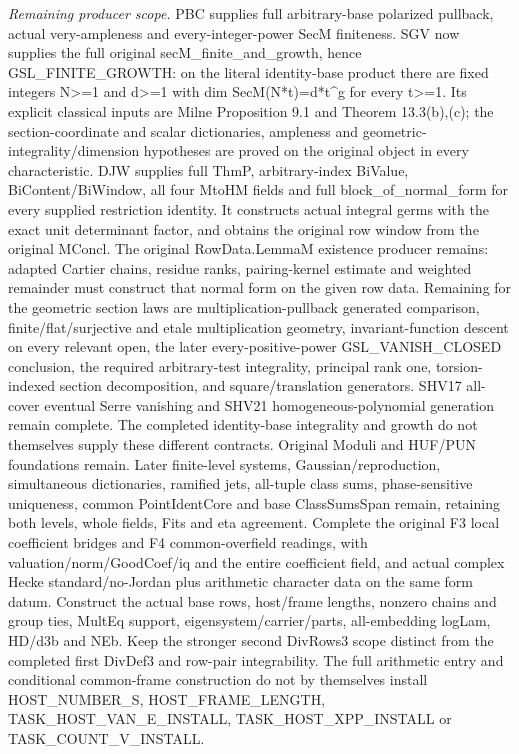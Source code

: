 \emph{Remaining producer scope.} PBC supplies full arbitrary-base polarized pullback, actual very-ampleness and every-integer-power SecM finiteness. SGV now supplies the full original secM\_\allowbreak finite\_\allowbreak and\_\allowbreak growth, hence GSL\_\allowbreak FINITE\_\allowbreak GROWTH: on the literal identity-base product there are fixed integers N>=1 and d>=1 with dim SecM(N*t)=d*t\textasciicircum{}g for every t>=1. Its explicit classical inputs are Milne Proposition 9.1 and Theorem 13.3(b),(c); the section-coordinate and scalar dictionaries, ampleness and geometric-integrality/dimension hypotheses are proved on the original object in every characteristic. DJW supplies full ThmP, arbitrary-index BiValue, BiContent/BiWindow, all four MtoHM fields and full block\_\allowbreak of\_\allowbreak normal\_\allowbreak form for every supplied restriction identity. It constructs actual integral germs with the exact unit determinant factor, and obtains the original row window from the original MConcl. The original RowData.LemmaM existence producer remains: adapted Cartier chains, residue ranks, pairing-kernel estimate and weighted remainder must construct that normal form on the given row data. Remaining for the geometric section laws are multiplication-pullback generated comparison, finite/flat/surjective and etale multiplication geometry, invariant-function descent on every relevant open, the later every-positive-power GSL\_\allowbreak VANISH\_\allowbreak CLOSED conclusion, the required arbitrary-test integrality, principal rank one, torsion-indexed section decomposition, and square/translation generators. SHV17 all-cover eventual Serre vanishing and SHV21 homogeneous-polynomial generation remain complete. The completed identity-base integrality and growth do not themselves supply these different contracts. Original Moduli and HUF/PUN foundations remain. Later finite-level systems, Gaussian/reproduction, simultaneous dictionaries, ramified jets, all-tuple class sums, phase-sensitive uniqueness, common PointIdentCore and base ClassSumsSpan remain, retaining both levels, whole fields, Fits and eta agreement. Complete the original F3 local coefficient bridges and F4 common-overfield readings, with valuation/norm/GoodCoef/iq and the entire coefficient field, and actual complex Hecke standard/no-Jordan plus arithmetic character data on the same form datum. Construct the actual base rows, host/frame lengths, nonzero chains and group ties, MultEq support, eigensystem/carrier/parts, all-embedding logLam, HD/d3b and NEb. Keep the stronger second DivRows3 scope distinct from the completed first DivDef3 and row-pair integrability. The full arithmetic entry and conditional common-frame construction do not by themselves install HOST\_\allowbreak NUMBER\_\allowbreak S, HOST\_\allowbreak FRAME\_\allowbreak LENGTH, TASK\_\allowbreak HOST\_\allowbreak VAN\_\allowbreak E\_\allowbreak INSTALL, TASK\_\allowbreak HOST\_\allowbreak XPP\_\allowbreak INSTALL or TASK\_\allowbreak COUNT\_\allowbreak V\_\allowbreak INSTALL.



